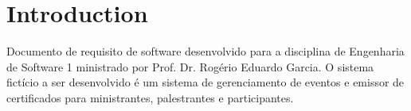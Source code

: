 \tableofcontents
\newpage

\section{Introduction}
Documento de requisito de software desenvolvido para a disciplina de Engenharia de Software 1 ministrado por Prof. Dr. Rogério Eduardo Garcia. O sistema fictício a ser desenvolvido é um sistema de gerenciamento de eventos e emissor de certificados para ministrantes, palestrantes e participantes.